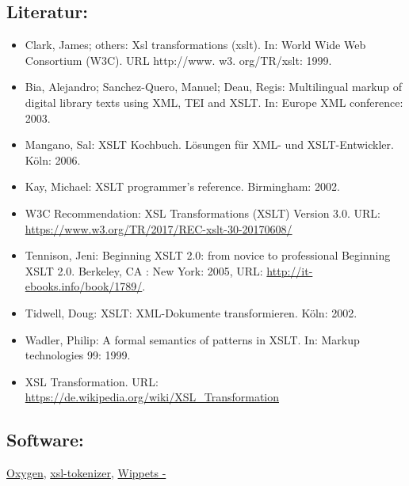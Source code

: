\documentclass{article}
\begin{document}
        \subsection*{Literatur:}\begin{itemize}\item Clark, James; others: Xsl transformations (xslt). In: World Wide Web Consortium (W3C). URL http://www. w3.
                              org/TR/xslt: 1999.\item Bia, Alejandro; Sanchez-Quero, Manuel; Deau, Regis: Multilingual markup of digital library texts using XML,
                              TEI and XSLT. In: Europe XML conference: 2003.\item Mangano, Sal: XSLT Kochbuch. Lösungen für XML- und
                              XSLT-Entwickler. Köln: 2006.\item Kay, Michael: XSLT programmer's reference. Birmingham: 2002.\item W3C Recommendation: XSL Transformations (XSLT) Version
                              3.0. URL: \url{https://www.w3.org/TR/2017/REC-xslt-30-20170608/}\item Tennison, Jeni: Beginning XSLT 2.0: from novice to professional Beginning XSLT 2.0. Berkeley, CA : New York: 2005, URL: \url{http://it-ebooks.info/book/1789/}.\item Tidwell, Doug: XSLT: XML-Dokumente transformieren. Köln: 2002.\item Wadler, Philip: A formal semantics of patterns in XSLT. In: Markup technologies 99: 1999.\item XSL Transformation. URL: \url{https://de.wikipedia.org/wiki/XSL_Transformation}\end{itemize}\subsection*{Software:}\href{http://oxygenxml.com/}{Oxygen}, \href{https://github.com/acdh-oeaw/xsl-tokenizer}{xsl-tokenizer}, \href{https://github.com/KONDE-AT}{Wippets -
}
\end{document}
